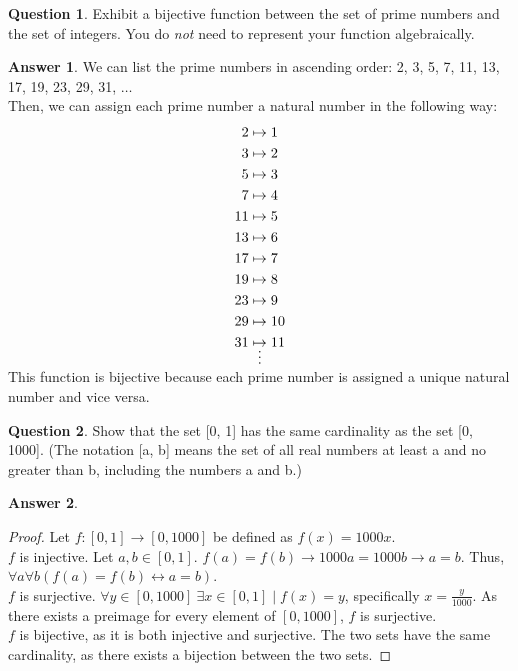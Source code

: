 \documentclass[article, 12pt]{article}
\theoremstyle{definition}
\newtheorem{question}{Question}
\newtheorem{answer}{Answer}
\begin{document}
    \begin{question}
        Exhibit a bijective function between the set of prime numbers and the set of integers. You do \textit{not} need to represent your function algebraically.
    \end{question}

    \begin{answer}
        We can list the prime numbers in ascending order: 2, 3, 5, 7, 11, 13, 17, 19, 23, 29, 31, $\dots$
        \\[12pt]
        Then, we can assign each prime number a natural number in the following way:
        \begin{align*}
            2 & \mapsto 1 \\
            3 & \mapsto 2 \\
            5 & \mapsto 3 \\
            7 & \mapsto 4 \\
            11 & \mapsto 5 \\
            13 & \mapsto 6 \\
            17 & \mapsto 7 \\
            19 & \mapsto 8 \\
            23 & \mapsto 9 \\
            29 & \mapsto 10 \\
            31 & \mapsto 11 \\
               &\shortvdotswithin{\mapsto}
        \end{align*}
        This function is bijective because each prime number is assigned a unique natural number and vice versa. 
    \end{answer}

    \begin{question}
        Show that the set [0, 1] has the same cardinality as the set [0, 1000]. (The notation [a, b] means the set of all real numbers at least a and no greater than b, including the numbers a and b.)    
    \end{question}  

    \begin{answer} \
        \begin{proof}
            Let $f: [0, 1] \to [0, 1000]$ be defined as $f(x) = 1000x$. 
            \\[12pt]
            $f$ is injective. Let $a,b \in [0, 1]$. $f(a) = f(b) \to 1000a = 1000b \to a = b$. Thus, \\ $\forall a \forall b (f(a) = f(b) \leftrightarrow a = b)$.
            \\[12pt]
            $f$ is surjective. $\forall y \in [0, 1000] \ \exists x \in [0, 1] \mid f(x) = y$, specifically $x = \displaystyle\frac{y}{1000}$. As there exists a preimage for every element of $[0, 1000]$, $f$ is surjective.
            \\[12pt]
            $f$ is bijective, as it is both injective and surjective. The two sets have the same cardinality, as there exists a bijection between the two sets.
        \end{proof}
    \end{answer}
\end{document}
